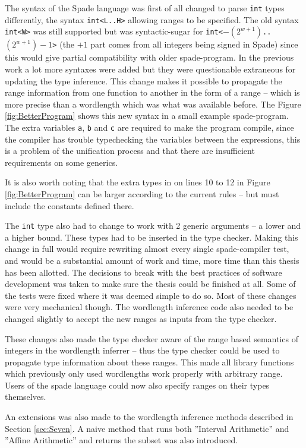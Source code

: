 The syntax of the Spade language was first of all changed to parse \verb+int+ types differently, the syntax \verb+int<L..H>+ allowing ranges to be specified. The old syntax \verb+int<W>+ was still supported but was syntactic-sugar for \verb!int<!$-(2^{w+1})$\verb!..!$(2^{w+1})-1$\verb!>! (the $+1$ part comes from all integers being signed in Spade) since this would give partial compatibility with older spade-program. In the previous work a lot more syntaxes were added but they were questionable extraneous for updating the type inference. This change makes it possible to propagate the range information from one function to another in the form of a range -- which is more precise than a wordlength which was what was available before. The Figure \ref{fig:BetterProgram} shows this new syntax in a small example spade-program. The extra variables \verb+a+, \verb+b+ and \verb+c+ are required to make the program compile, since the compiler has trouble typechecking the variables between the expressions, this is a problem of the unification process and that there are insufficient requirements on some generics.

It is also worth noting that the extra types in on lines 10 to 12 in Figure \ref{fig:BetterProgram} can be larger according to the current rules -- but must include the constants defined there.

The \verb+int+ type also had to change to work with 2 generic arguments -- a lower and a higher bound. These types had to be inserted in the type checker. Making this change in full would require rewriting almost every single spade-compiler test, and would be a substantial amount of work and time, more time than this thesis has been allotted. The decisions to break with the best practices of software development was taken to make sure the thesis could be finished at all. Some of the tests were fixed where it was deemed simple to do so. Most of these changes were very mechanical though. The wordlength inference code also needed to be changed slightly to accept the new ranges as inputs from the type checker.

These changes also made the type checker aware of the range based semantics of integers in the wordlength inferrer -- thus the type checker could be used to propagate type information about these ranges. This made all library functions which previously only used wordlengths work properly with arbitrary range. Users of the spade language could now also specify ranges on their types themselves.

An extensions was also made to the wordlength inference methods described in Section \ref{sec:Seven}. A naive method that runs both ''Interval Arithmetic'' and ''Affine Arithmetic'' and returns the subset was also introduced.

